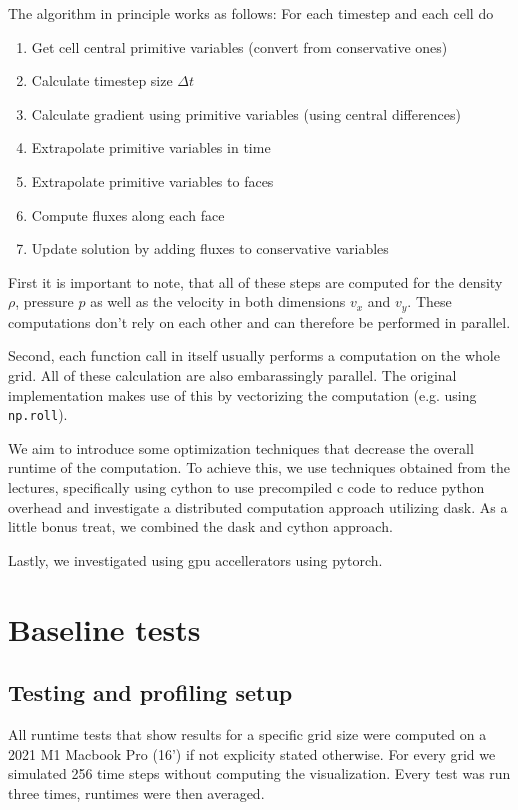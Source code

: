 \documentclass[a4paper,10pt]{article}
\begin{document}
The algorithm in principle works as follows:
For each timestep and each cell do
\begin{enumerate}
  \item Get cell central primitive variables (convert from conservative ones)
  \item Calculate timestep size $\Delta t$
  \item Calculate gradient using primitive variables (using central differences)
  \item Extrapolate primitive variables in time
  \item Extrapolate primitive variables to faces
  \item Compute fluxes along each face
  \item Update solution by adding fluxes to conservative variables
\end{enumerate}

First it is important to note, that all of these steps are computed for the density $\rho$, pressure $p$ as well as the velocity in both dimensions $v_x$ and $v_y$.
These computations don't rely on each other and can therefore be performed in parallel.

Second, each function call in itself usually performs a computation on the whole grid.
All of these calculation are also embarassingly parallel.
The original implementation makes use of this by vectorizing the computation (e.g. using \verb|np.roll|).

We aim to introduce some optimization techniques that decrease the overall runtime of the computation.
To achieve this, we use techniques obtained from the lectures, specifically using cython to use precompiled c code to reduce python overhead and investigate a distributed computation approach utilizing dask.
As a little bonus treat, we combined the dask and cython approach.

Lastly, we investigated using gpu accellerators using pytorch.


\section{Baseline tests}
\subsection{Testing and profiling setup}
All runtime tests that show results for a specific grid size were computed on a 2021 M1 Macbook Pro (16') if not explicity stated otherwise.
For every grid we simulated 256 time steps without computing the visualization.
Every test was run three times, runtimes were then averaged.
\end{document}
